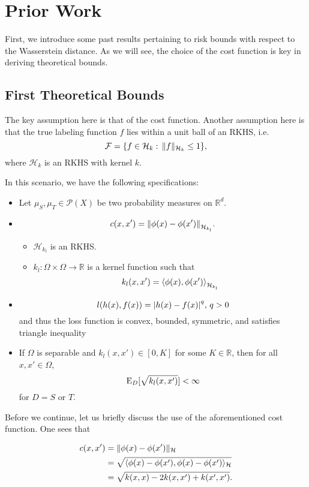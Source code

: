 \section*{Prior Work}

First, we introduce some past results pertaining to risk bounds with respect to the Wasserstein distance. As we will see, the choice of the cost function is key in deriving theoretical bounds.

\subsection*{First Theoretical Bounds \cite{Redko2017}}
The key assumption here is that of the cost function. Another assumption here is that the true labeling function $f$ lies within a unit ball of an RKHS, i.e. \[\mathcal{F} = \{f\in \mathcal{H}_k: \, \norm{f}_{\mathcal{H}_k}\leq 1\},\] where $\mathcal{H}_k$ is an RKHS with kernel $k$.

In this scenario, we have the following specifications:
\begin{itemize}
	\item Let $\mu_S, \mu_T\in \mathcal{P}(X)$ be two probability measures on $\mathbb{R}^d$.
	\item \[c(x,x') = \norm*{\phi(x)-\phi(x')}_{\mathcal{H}_{k_l}}.\] 
	\begin{itemize}
		\item $\mathcal{H}_{k_l}$ is an RKHS.
		\item $k_l: \Omega\times \Omega\to \mathbb{R}$ is a kernel function such that \[k_l(x,x')=\ang*{\phi(x),\phi(x')}_{\mathcal{H}_{k_l}}\]
	\end{itemize}
	\item \[l(h(x),f(x)) = \abs*{h(x)-f(x)}^q,\, q>0\] and thus the loss function is convex, bounded, symmetric, and satisfies triangle inequality
	\item If $\Omega$ is separable and $k_l(x,x')\in [0,K]$ for some $K\in \mathbb{R}$, then for all $x,x'\in \Omega$,
	\[
	\E_D[\sqrt{k_l(x,x')}]<\infty
	\] for $D=S$ or $T$.
\end{itemize}

Before we continue, let us briefly discuss the use of the aforementioned cost function. One sees that

\begin{align*}
c(x,x')&=\norm{\phi(x)-\phi(x')}_{\mathcal{H}} \\
&= \sqrt{\ang{\phi(x)-\phi(x'),\phi(x)-\phi(x')}_{\mathcal{H}}} \\
&= \sqrt{k(x,x)-2k(x,x')+k(x',x')}.
\end{align*}

